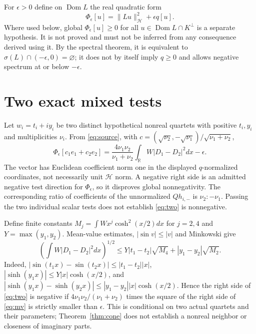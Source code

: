 \documentclass[11pt,a4paper]{article}
\newcommand{\R}{\mathbb R}\newcommand{\C}{\mathbb C}\newcommand{\norm}[1]{\lVert#1\rVert}\newcommand{\dom}{\operatorname{Dom}}
\begin{document}
For $\epsilon>0$ define on $\dom L$ the real quadratic form
\begin{equation}\label{eq:Phi}
 \Phi_\epsilon[u]=\|Lu\|_{\mathcal H}^2+\epsilon q[u].
\end{equation}
Where used below, global $\Phi_\epsilon[u]\ge0$ for all $u\in\dom L\cap K^\perp$ is a separate hypothesis. It is not proved and must not be inferred from any consequence derived using it. By the spectral theorem, it is equivalent to $\sigma(L)\cap(-\epsilon,0)=\varnothing$; it does not by itself imply $q\ge0$ and allows negative spectrum at or below $-\epsilon$.

\section{Two exact mixed tests}\label{sec:tests}
Let $w_i=t_i+iy_i$ be two distinct hypothetical nonreal quartets with positive $t_i,y_i$ and multiplicities $\nu_i$. From \eqref{eq:source}, with $c=(\sqrt{\nu_2},-\sqrt{\nu_1})/\sqrt{\nu_1+\nu_2}$,
\begin{equation}\label{eq:two}
 \Phi_\epsilon[c_1e_1+c_2e_2]=\frac{4\nu_1\nu_2}{\nu_1+\nu_2}\int_\R W|D_1-D_2|^2dx-\epsilon.
\end{equation}
The vector has Euclidean coefficient norm one in the displayed $q$-normalized coordinates, not necessarily unit $\mathcal H$ norm. A negative right side is an admitted negative test direction for $\Phi_\epsilon$, so it disproves global nonnegativity. The corresponding ratio of coefficients of the unnormalized $Qh_{i,-}$ is $\nu_2:-\nu_1$. Passing the two individual scalar tests does not establish \eqref{eq:two} is nonnegative.

Define finite constants $M_j=\int W x^j\cosh^2(x/2)dx$ for $j=2,4$ and $Y=\max(y_1,y_2)$. Mean-value estimates, $|\sin v|\le|v|$ and Minkowski give
\begin{equation}\label{eq:mv}
 \left(\int W|D_1-D_2|^2dx\right)^{1/2}\le Y|t_1-t_2|\sqrt{M_4}+|y_1-y_2|\sqrt{M_2}.
\end{equation}
Indeed, $|\sin(t_1x)-\sin(t_2x)|\le |t_1-t_2||x|$, $|\sinh(y_1x)|\le Y|x|\cosh(x/2)$, and $|\sinh(y_1x)-\sinh(y_2x)|\le |y_1-y_2||x|\cosh(x/2)$. Hence the right side of \eqref{eq:two} is negative if $4\nu_1\nu_2/(\nu_1+\nu_2)$ times the square of the right side of \eqref{eq:mv} is strictly smaller than $\epsilon$. This is conditional on two actual quartets and their parameters; Theorem~\ref{thm:cone} does not establish a nonreal neighbor or closeness of imaginary parts.
\end{document}
